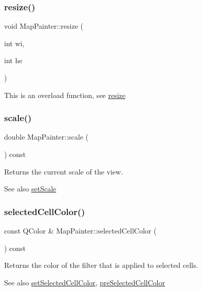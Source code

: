 \subsubsection{\texorpdfstring{resize()}{resize()}\hspace{0.1cm}{\footnotesize\ttfamily [2/2]}}
{\footnotesize\ttfamily void Map\+Painter\+::resize (\begin{DoxyParamCaption}\item[{int}]{wi,  }\item[{int}]{he }\end{DoxyParamCaption})}

This is an overload function, see \hyperlink{class_map_painter_ae215f704c3f1ee11bb89861b9b4b13d3}{resize} \hypertarget{class_map_painter_af923e94f6a43d1341282d61aaf8603e7}{}\label{class_map_painter_af923e94f6a43d1341282d61aaf8603e7} 
\subsubsection{\texorpdfstring{scale()}{scale()}}
{\footnotesize\ttfamily double Map\+Painter\+::scale (\begin{DoxyParamCaption}{ }\end{DoxyParamCaption}) const}

Returns the current scale of the view.

\begin{DoxySeeAlso}{See also}
\hyperlink{class_map_painter_ae1d7e11835d4ee6588c5b5f0429787e3}{set\+Scale} 
\end{DoxySeeAlso}
\hypertarget{class_map_painter_a5669055f03fd84f772d77fd80de9b39f}{}\label{class_map_painter_a5669055f03fd84f772d77fd80de9b39f} 
\subsubsection{\texorpdfstring{selected\+Cell\+Color()}{selectedCellColor()}}
{\footnotesize\ttfamily const Q\+Color \& Map\+Painter\+::selected\+Cell\+Color (\begin{DoxyParamCaption}{ }\end{DoxyParamCaption}) const}

Returns the color of the filter that is applied to selected cells.

\begin{DoxySeeAlso}{See also}
\hyperlink{class_map_painter_ad1658d299eaee7ccdad70f00ad3f76d8}{set\+Selected\+Cell\+Color}, \hyperlink{class_map_painter_a2498d8b426f723fe980219ded809a5fa}{pre\+Selected\+Cell\+Color} 
\end{DoxySeeAlso}
\hypertarget{class_map_painter_ad7effe1c69fb1409d696dd54edd8bbb3}{}\label{class_map_painter_ad7effe1c69fb1409d696dd54edd8bbb3} 

